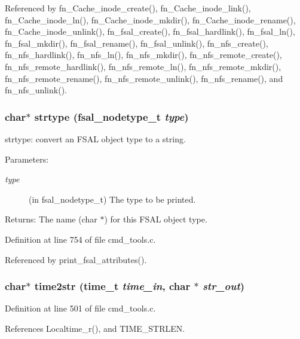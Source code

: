 Referenced by fn\_\-Cache\_\-inode\_\-create(), fn\_\-Cache\_\-inode\_\-link(), fn\_\-Cache\_\-inode\_\-ln(), fn\_\-Cache\_\-inode\_\-mkdir(), fn\_\-Cache\_\-inode\_\-rename(), fn\_\-Cache\_\-inode\_\-unlink(), fn\_\-fsal\_\-create(), fn\_\-fsal\_\-hardlink(), fn\_\-fsal\_\-ln(), fn\_\-fsal\_\-mkdir(), fn\_\-fsal\_\-rename(), fn\_\-fsal\_\-unlink(), fn\_\-nfs\_\-create(), fn\_\-nfs\_\-hardlink(), fn\_\-nfs\_\-ln(), fn\_\-nfs\_\-mkdir(), fn\_\-nfs\_\-remote\_\-create(), fn\_\-nfs\_\-remote\_\-hardlink(), fn\_\-nfs\_\-remote\_\-ln(), fn\_\-nfs\_\-remote\_\-mkdir(), fn\_\-nfs\_\-remote\_\-rename(), fn\_\-nfs\_\-remote\_\-unlink(), fn\_\-nfs\_\-rename(), and fn\_\-nfs\_\-unlink().
\subsubsection{\setlength{\rightskip}{0pt plus 5cm}char$\ast$ strtype (fsal\_\-nodetype\_\-t {\em type})}\label{cmd__tools_8h_a20}


strtype: convert an FSAL object type to a string.

\begin{Desc}
\item[Parameters:]
\begin{description}
\item[{\em type}](in fsal\_\-nodetype\_\-t) The type to be printed. \end{description}
\end{Desc}
\begin{Desc}
\item[Returns:]The name (char $\ast$) for this FSAL object type. \end{Desc}


Definition at line 754 of file cmd\_\-tools.c.

Referenced by print\_\-fsal\_\-attributes().
\subsubsection{\setlength{\rightskip}{0pt plus 5cm}char$\ast$ time2str (time\_\-t {\em time\_\-in}, char $\ast$ {\em str\_\-out})}\label{cmd__tools_8h_a14}




Definition at line 501 of file cmd\_\-tools.c.

References Localtime\_\-r(), and TIME\_\-STRLEN.

